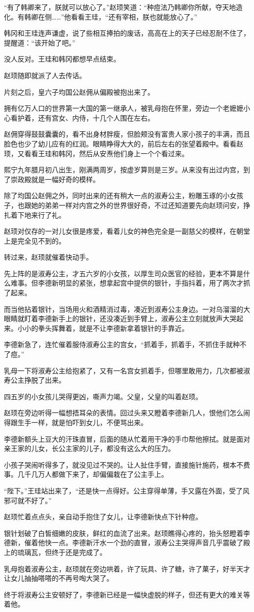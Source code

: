 “有了韩卿来了，朕就可以放心了。”赵顼笑道：“种痘法乃韩卿你所献，夺天地造化。有韩卿在侧……”他看看王珪，“还有宰相，朕也就能放心了。”

韩冈和王珪连声谦虚，说了些相互捧拍的废话，高高在上的天子已经忍耐不住了，提醒道：“该开始了吧。”

没人反对。王珪和韩冈都想早点结束。

赵顼随即就派了人去传话。

片刻之后，皇六子均国公赵佣从偏殿被抱出来了。

拥有亿万人口的世界第一大国的第一继承人，被乳母抱在怀里，旁边一个老嬷嬷小心看护着，还有宫女、内侍，十几个人围在左右。

赵佣穿得鼓鼓囊囊的，看不出身材胖瘦，但脸颊没有富贵人家小孩子的丰满，而且脸色也少了幼儿应有的红润。眼睛睁得大大的，前后左右的张望着殿中。看看赵顼，又看看王珪和韩冈，然后从安焘他们身上一个个看过来。

熙宁九年腊月初八出生，刚满两周岁，按虚岁算则是三岁。从来没有出过内宫，到了崇政殿就是一幅好奇的模样。

除了均国公赵佣之外，同时出来的还有稍大一点的淑寿公主，粉雕玉琢的小女孩子，也跟她的弟弟一样对内宫之外的世界很好奇，不过还知道要先向赵顼问安，挣扎着下地来行了礼。

赵顼对仅存的一对儿女很是疼爱，看着儿女的神色完全是一副慈父的模样，在朝堂上是完全见不到的。

转过来，赵顼就催着快动手。

先上阵的是淑寿公主，才五六岁的小女孩，以厚生司众医官的经验，更本不算是什么难事。但李德新明显的紧张，想拿起宫中提供的银针，手指抖着，用了两次才抓了起来。

而当他拈着银针，当场用火和酒精消过毒，凑近到淑寿公主身边。一对乌溜溜的大眼睛就盯着李德新手上的银针，还没凑近到手臂上，淑寿公主立刻就放声大哭起来。小小的拳头挥舞着，就是不让李德新拿着银针的手靠近。

李德新急了，连忙催着服侍淑寿公主的宫女，“抓着手，抓着手，不抓住手就种不了痘。”

乳母一下将淑寿公主给抱紧了，又有一名宫女抓着手，但哪里敢用力，几次都被淑寿公主挣脱了出来。

四五岁的小女孩儿哭得更凶，嘶声力竭。父皇，父皇的叫着赵顼。

赵顼在旁边听得一幅想捂耳朵的表情。回过头来又瞪着李德新几人，恨他们怎么闹得跟生手一样，就是怕吓到女儿，不便骂出来。

李德新额头上豆大的汗珠直冒，后面的随从忙着用干净的手巾帮他擦拭。就是面对亲王家的儿女，长公主家的儿子，都没有这么大的压力。

小孩子哭闹听得多了，就没见过不哭的。让人扯住手臂，直接施针施药，根本不费事。几千几万人都做下来了，却偏偏栽在了公主手上。

“陛下。”王珪站出来了，“还是快一点得好。公主穿得单薄，手又露在外面，受了风邪可就不好了。”

赵顼忙着点点头，亲自动手抱住了女儿，让李德新快点下针种痘。

银针划破了白皙细嫩的皮肤，鲜红的血流了出来。赵顼瞧得心疼的，抬头怒瞪着李德新，催着他快一点。李德新汗水一个劲的直冒，淑寿公主哭得声音几乎震破了殿上的琉璃瓦，但终于还是完成了。

乳母抱着淑寿公主，赵顼就在旁边哄着，许了玩具、许了糖，许了菓子，好半天才让女儿抽抽嗒嗒的不再号啕大哭了。

终于将淑寿公主安顿好了，李德新已经是一幅快虚脱的样子，但还有更大的难关等着他。

